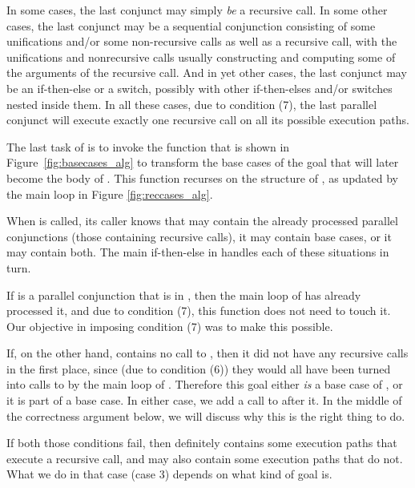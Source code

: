 In some cases, the last conjunct may simply \emph{be} a recursive call.
In some other cases, the last conjunct may be a sequential conjunction
consisting of some unifications and/or some non-recursive calls
as well as a recursive call,
with the unifications and nonrecursive calls
usually constructing and computing some of the arguments of the recursive call.
And in yet other cases,
the last conjunct may be an if-then-else or a switch,
possibly with other if-then-elses and/or switches nested inside them.
In all these cases, due to condition (7),
the last parallel conjunct will execute exactly one recursive call
on all its possible execution paths.

The last task of \createloopgoal is to invoke the
\putbarriers function
that is shown in Figure~\ref{fig:basecases_alg}
to transform the base cases of the goal
that will later become the body of .
This function recurses on the structure of ,
as updated by the main loop in Figure \ref{fig:reccases_alg}.

When \putbarriers is called,
its caller knows that  may contain
the already processed parallel conjunctions (those containing recursive calls),
it may contain base cases,
or it may contain both.
The main if-then-else in \putbarriers
handles each of these situations in turn.

If  is a parallel conjunction that is in ,
then the main loop of \createloopgoal has already processed it,
and due to condition (7), this function does not need to touch it.
Our objective in imposing condition (7) was to make this possible.

If, on the other hand,  contains no call to ,
then it did not have any recursive calls in the first place,
since (due to condition (6))
they would all have been turned into calls to 
by the main loop of \createloopgoal.
Therefore this goal either \emph{is} a base case of ,
or it is part of a base case.
In either case, we add a call to  after it.
In the middle of the correctness argument below,
we will discuss why this is the right thing to do.

If both those conditions fail,
then 
definitely contains some execution paths that execute a recursive call,
and may also contain some execution paths that do not.
What we do in that case (case 3)
depends on what kind of goal  is.

